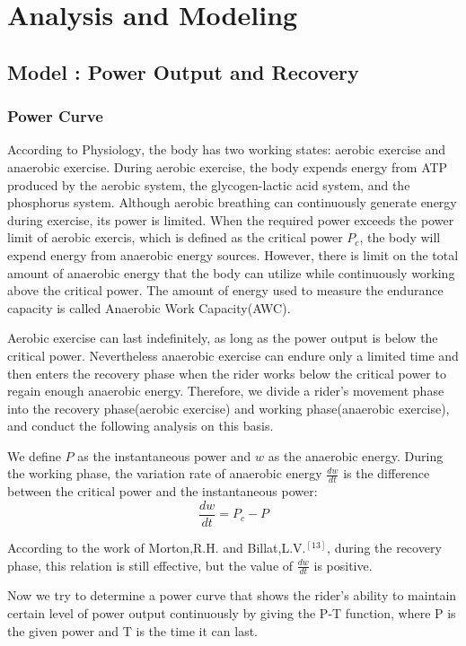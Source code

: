 \documentclass{mcmthesis}
\newcommand{\upcite}[1]{\textsuperscript{\textsuperscript{\cite{#1}}}}
\begin{document}
\section{Analysis and Modeling}
\subsection{Model \uppercase\expandafter{}: Power Output and Recovery}

\subsubsection{Power Curve}
\qquad
According to Physiology\upcite{8}, the body has two working states: aerobic exercise and anaerobic exercise. During aerobic exercise, the body expends energy from ATP produced by the aerobic system, the glycogen-lactic acid system, and the phosphorus system. Although aerobic breathing can continuously generate energy during exercise, its power is limited. When the required power exceeds the power limit of aerobic exercis, which is defined as the critical power $P_c$, the body will expend energy from anaerobic energy sources. However, there is limit on the total amount of anaerobic energy that the body can utilize while continuously working above the critical power. The amount of energy used to measure the endurance capacity is called Anaerobic Work Capacity(AWC).

Aerobic exercise can last indefinitely, as long as the power output is below the critical power. Nevertheless anaerobic exercise can endure only a limited time and then enters the recovery phase when the rider works below the critical power to regain enough anaerobic energy. Therefore, we divide a rider's movement phase into the recovery phase(aerobic exercise) and working phase(anaerobic exercise), and conduct the following analysis on this basis.

We define $P$ as the instantaneous power and $w$ as the anaerobic energy. During the working phase, the variation rate of anaerobic energy $\frac{dw}{dt}$ is the difference between the critical power and the instantaneous power:
\begin{equation}
	\frac{dw}{dt}=P_c-P
\end{equation}

According to the work of Morton,R.H. and Billat,L.V.$^{[13]}$, during the recovery phase, this relation is still effective, but the value of $\frac{dw}{dt}$ is positive.


Now we try to determine a power curve that shows the rider's ability to maintain certain level of power output continuously by giving the P-T function, where P is the given power and T is the time it can last.
\end{document}
